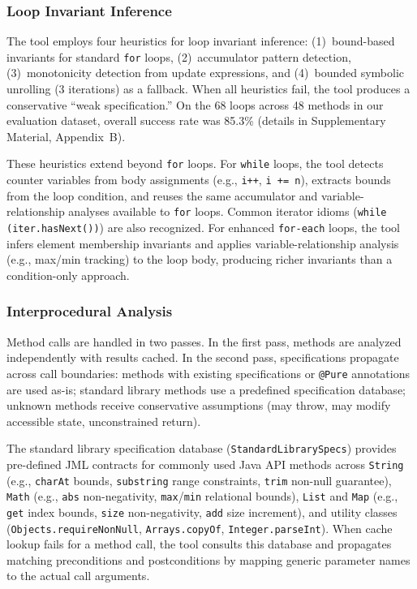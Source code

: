 \subsubsection{Loop Invariant Inference}
\label{subsec:loop-heuristics}

The tool employs four heuristics for loop invariant inference: (1)~bound-based invariants for standard \texttt{for} loops, (2)~accumulator pattern detection, (3)~monotonicity detection from update expressions, and (4)~bounded symbolic unrolling (3 iterations) as a fallback. When all heuristics fail, the tool produces a conservative ``weak specification.'' On the 68 loops across 48 methods in our evaluation dataset, overall success rate was 85.3\% (details in Supplementary Material, Appendix~B).

These heuristics extend beyond \texttt{for} loops. For \texttt{while} loops, the tool detects counter variables from body assignments (e.g., \texttt{i++}, \texttt{i += n}), extracts bounds from the loop condition, and reuses the same accumulator and variable-relationship analyses available to \texttt{for} loops. Common iterator idioms (\texttt{while (iter.hasNext())}) are also recognized. For enhanced \texttt{for-each} loops, the tool infers element membership invariants and applies variable-relationship analysis (e.g., max/min tracking) to the loop body, producing richer invariants than a condition-only approach.

\subsubsection{Interprocedural Analysis}
\label{subsec:method-calls}

Method calls are handled in two passes. In the first pass, methods are analyzed independently with results cached. In the second pass, specifications propagate across call boundaries: methods with existing specifications or \texttt{@Pure} annotations are used as-is; standard library methods use a predefined specification database; unknown methods receive conservative assumptions (may throw, may modify accessible state, unconstrained return).

The standard library specification database (\texttt{StandardLibrarySpecs}) provides pre-defined JML contracts for commonly used Java API methods across \texttt{String} (e.g., \texttt{charAt} bounds, \texttt{substring} range constraints, \texttt{trim} non-null guarantee), \texttt{Math} (e.g., \texttt{abs} non-negativity, \texttt{max}/\texttt{min} relational bounds), \texttt{List} and \texttt{Map} (e.g., \texttt{get} index bounds, \texttt{size} non-negativity, \texttt{add} size increment), and utility classes (\texttt{Objects.requireNonNull}, \texttt{Arrays.copyOf}, \texttt{Integer.parseInt}). When cache lookup fails for a method call, the tool consults this database and propagates matching preconditions and postconditions by mapping generic parameter names to the actual call arguments.


